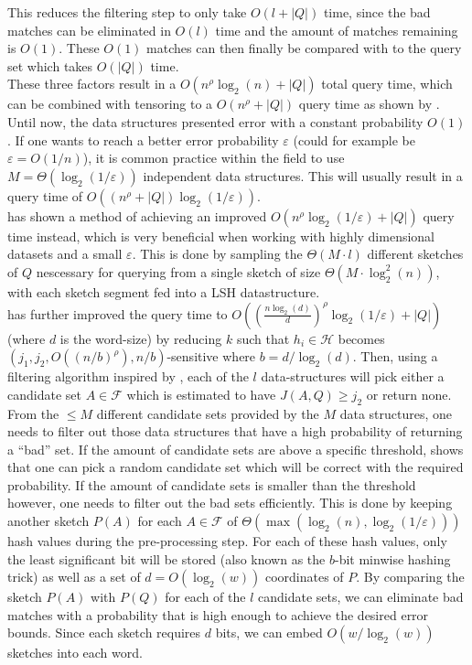 This reduces the filtering step to only take $O(l + |Q|)$ time, since the bad matches can be eliminated in $O(l)$ time and the amount of matches remaining is $O(1)$. These $O(1)$ matches can then finally be compared with to the query set which takes $O(|Q|)$ time.\\
These three factors result in a $O(n^\rho \log_2(n) + |Q|)$ total query time, which can be combined with tensoring to a $O(n^\rho + |Q|)$ query time as shown by \citet{christiani2018fast}.\\
Until now, the data structures presented error with a constant probability $O(1)$. If one wants to reach a better error probability $\varepsilon$ (could for example be $\varepsilon = O(1/n)$), it is common practice within the field to use $M=\Theta(\log_2(1/\varepsilon))$ independent data structures. This will usually result in a query time of $O((n^\rho + |Q|)\log_2(1/\varepsilon))$. \\
\citet{fast-similarity-search} has shown a method of achieving an improved $O(n^\rho \log_2(1/\varepsilon)+|Q|)$ query time instead, which is very beneficial when working with highly dimensional datasets and a small $\varepsilon$. This is done by sampling the $\Theta(M\cdot l)$ different sketches of $Q$ nescessary for querying from a single sketch of size $\Theta(M\cdot \log^2_2(n))$, with each sketch segment fed into a LSH datastructure. \\
\citet{fast-similarity-search} has further improved the query time to $O((\frac{n\log_2(d)}{d})^{\rho}\log_2(1/\varepsilon)+|Q|)$ (where $d$ is the word-size) by reducing $k$ such that $h_i\in \mathcal{H}$ becomes $(j_1, j_2, O((n/b)^\rho), n/b)$-sensitive where $b=d/\log_2(d)$. Then, using a filtering algorithm inspired by \cite{fast-similarity-search}, each of the $l$ data-structures will pick either a candidate set $A\in \mathcal{F}$ which is estimated to have $J(A,Q) \geq j_2$ or return none. \\
From the $\leq M$ different candidate sets provided by the $M$ data structures, one needs to filter out those data structures that have a high probability of returning a ``bad'' set.
If the amount of candidate sets are above a specific threshold, \citet{fast-similarity-search} shows that one can pick a random candidate set which will be correct with the required probability. If the amount of candidate sets is smaller than the threshold however, one needs to filter out the bad sets efficiently. 
This is done by keeping another sketch $P(A)$ for each $A\in \mathcal{F}$ of $\Theta(\max(\log_2(n), \log_2(1/\varepsilon)))$ hash values during the pre-processing step. For each of these hash values, only the least significant bit will be stored (also known as the $b$-bit minwise hashing trick\cite{li2011hashing}) as well as a set of $d=O(\log_2(w))$ coordinates of $P$. By comparing the sketch $P(A)$ with $P(Q)$ for each of the $l$ candidate sets, we can eliminate bad matches with a probability that is high enough to achieve the desired error bounds. Since each sketch requires $d$ bits, we can embed $O(w/\log_2(w))$ sketches into each word.
